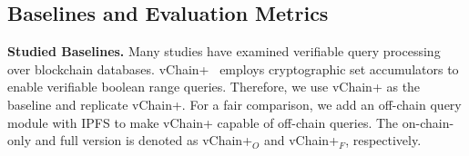 

\subsection{Baselines and Evaluation Metrics}


{\bf Studied Baselines.} 
Many studies have examined verifiable query processing over blockchain databases. 
vChain+~\cite{wang2022vchain+} employs cryptographic set accumulators to enable verifiable boolean range queries.
Therefore, we use vChain+ as the baseline and replicate vChain+.
For a fair comparison, we add an off-chain query module with IPFS to make vChain+ capable of off-chain queries.
The on-chain-only and full version is denoted as vChain+$_O$ and vChain+$_F$, respectively.




